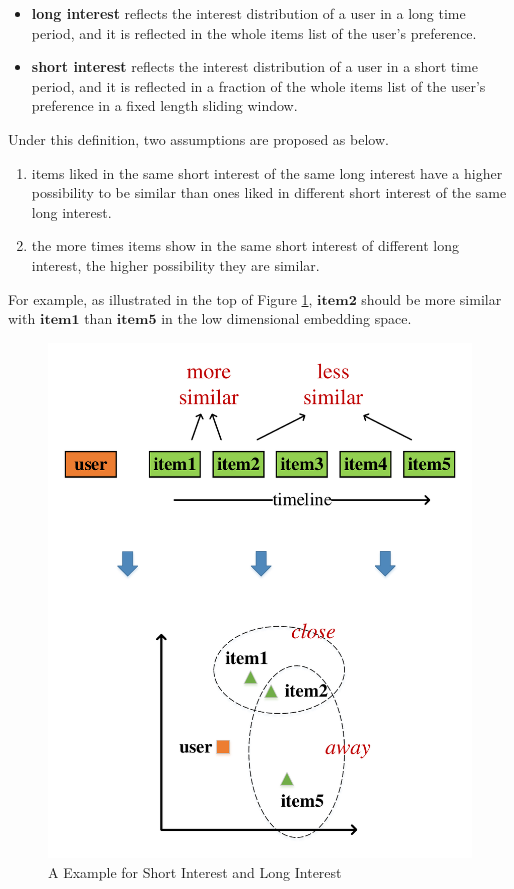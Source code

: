 \documentclass{llncs}
\begin{document}
\begin{itemize}
	\item \textbf{long interest} reflects the interest distribution of a user
	in a long time period, and it is reflected in the whole items list of the user's preference.
	\item \textbf{short interest} reflects the interest distribution of a user
	in a short time period, and it is reflected in a fraction of the whole items list of
	the user's preference in a fixed length sliding window.
\end{itemize}

Under this definition, two assumptions are proposed as below.

\begin{enumerate}
	\item items liked in the same short interest of the same long interest have a higher
	possibility to be similar than ones liked in different short interest of the same long interest.
	\item the more times items show in the same short interest of different long interest,
	the higher possibility they are similar.
\end{enumerate}

For example, as illustrated in the top of Figure \ref{fig:embedding},
$\mathbf{item2}$ should be more similar with $\mathbf{item1}$ than $\mathbf{item5}$
in the low dimensional embedding space.

\begin{figure}[htbp]
	\centering
	\includegraphics[scale=0.35]{images/embedding.pdf}
	\caption{A Example for Short Interest and Long Interest}
	\label{fig:embedding}
\end{figure}
\end{document}
